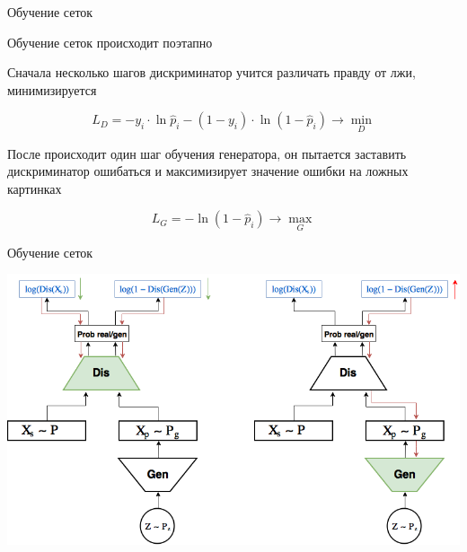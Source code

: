 \documentclass[notes,12pt, aspectratio=169]{beamer}
\newenvironment{wideitemize}{\itemize\addtolength{\itemsep}{10pt}}{\enditemize}
\begin{document}
\begin{frame}{Обучение сеток}
\begin{wideitemize}
	\item   Обучение сеток происходит поэтапно 
	\item   Сначала несколько шагов дискриминатор учится различать правду от лжи, минимизируется  
	
	\[ L_D =  - y_i \cdot \ln \hat p_i - (1 - y_i) \cdot \ln (1 - \hat p_i)  \to \min_{D} \]  \pause 
	
	\item   После происходит один шаг обучения генератора, он пытается заставить дискриминатор ошибаться и максимизирует значение ошибки на ложных картинках
	
	\[ 
	L_G = - \ln (1 - \hat p_i)  \to \max_{G}
	\]
\end{wideitemize}
\end{frame}


\begin{frame}{Обучение сеток}
\begin{center}
	\includegraphics[width=.8\linewidth]{gan_2.png}
\end{center}
\end{frame}


%	
%	
%	
%
%
\end{document}
